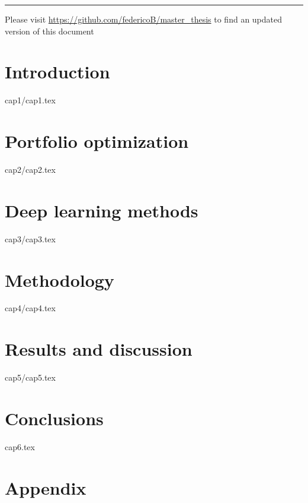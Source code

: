 \documentclass[12pt,a4paper]{book}
\begin{document}
    
    \newpage
    \tableofcontents
    \vfill
    \rule{\textwidth}{0.3mm}
    Please visit \url{https://github.com/federicoB/master_thesis} to find an updated version of this document
    
    \newpage
    \listoffigures
    
    \newpage
    \listoftables
    
    \chapter{Introduction} 
    \label{CH:Intro}
    {cap1/cap1.tex}
    
    \chapter{Portfolio optimization}
    \label{CH:theoryFI}
    {cap2/cap2.tex}

    \chapter{Deep learning methods}
    \label{CH:theoryML}
    {cap3/cap3.tex}
    
    \chapter{Methodology}
    \label{CH:Model_research}
    {cap4/cap4.tex}


    \chapter{Results and discussion}
    \label{CH:Results}
    {cap5/cap5.tex}
    
    \chapter{Conclusions}
    \label{CH:Concl}
    {cap6.tex}
    
    
    

    
    \newpage
    \chapter*{Appendix}
\end{document}
